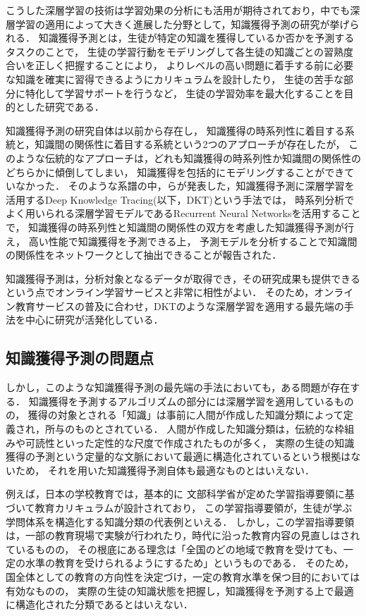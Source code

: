 こうした深層学習の技術は学習効果の分析にも活用が期待されており，中でも深層学習の適用によって大きく進展した分野として，知識獲得予測の研究が挙げられる．
知識獲得予測とは，生徒が特定の知識を獲得しているか否かを予測するタスクのことで，
生徒の学習行動をモデリングして各生徒の知識ごとの習熟度合いを正しく把握することにより，
よりレベルの高い問題に着手する前に必要な知識を確実に習得できるようにカリキュラムを設計したり，
生徒の苦手な部分に特化して学習サポートを行うなど，
生徒の学習効率を最大化することを目的とした研究である．

知識獲得予測の研究自体は以前から存在し，
知識獲得の時系列性に着目する系統と，知識間の関係性に着目する系統という2つのアプローチが存在したが，
このような伝統的なアプローチは，どれも知識獲得の時系列性か知識間の関係性のどちらかに傾倒してしまい，
知識獲得を包括的にモデリングすることができていなかった．
そのような系譜の中，\cite{piech2015deep}らが発表した，知識獲得予測に深層学習を活用するDeep Knowledge Tracing(以下，DKT)という手法では，
時系列分析でよく用いられる深層学習モデルであるRecurrent Neural Networks\cite{williams1989learning}を活用することで，
知識獲得の時系列性と知識間の関係性の双方を考慮した知識獲得予測が行え，
高い性能で知識獲得を予測できる上，
予測モデルを分析することで知識間の関係性をネットワークとして抽出できることが報告された．

知識獲得予測は，分析対象となるデータが取得でき，その研究成果も提供できるという点でオンライン学習サービスと非常に相性がよい．
そのため，オンライン教育サービスの普及に合わせ，DKTのような深層学習を適用する最先端の手法を中心に研究が活発化している．

\subsection{知識獲得予測の問題点}

しかし，このような知識獲得予測の最先端の手法においても，ある問題が存在する．
知識獲得を予測するアルゴリズムの部分には深層学習を適用しているものの，
獲得の対象とされる「知識」は事前に人間が作成した知識分類によって定義され，所与のものとされている．
人間が作成した知識分類は，伝統的な枠組みや可読性といった定性的な尺度で作成されたものが多く，
実際の生徒の知識獲得の予測という定量的な文脈において最適に構造化されているという根拠はないため，
それを用いた知識獲得予測自体も最適なものとはいえない．

例えば，日本の学校教育では，基本的に
文部科学省が定めた学習指導要領\cite{gakushushidouyouryou}に基づいて教育カリキュラムが設計されており，
この学習指導要領が，生徒が学ぶ学問体系を構造化する知識分類の代表例といえる．
しかし，この学習指導要領は，一部の教育現場で実験が行われたり，時代に沿った教育内容の見直しはされているものの，
その根底にある理念は「全国のどの地域で教育を受けても、一定の水準の教育を受けられるようにするため」\cite{gakushushidouyouryou}というものである．
そのため，国全体としての教育の方向性を決定づけ，一定の教育水準を保つ目的においては有効なものの，
実際の生徒の知識状態を把握し，知識獲得を予測する上で最適に構造化された分類であるとはいえない．



